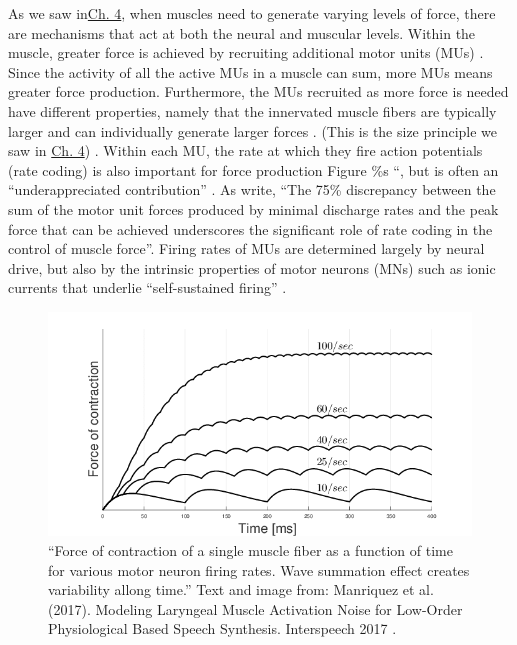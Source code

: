 \documentclass{article}
\begin{document}
As we saw in\href{https://curvenote.com/oxa:EPpXta8zJdzN048lz8AR/oZzZ9YkLDYhuIWC3d5Sk}{Ch. 4}, when muscles need to generate varying levels of force, there are mechanisms that act at both the neural and muscular levels. Within the muscle, greater force is achieved by recruiting additional motor units (MUs) \citep{openStax_neuro}. Since the activity of all the active MUs in a muscle can sum, more MUs means greater force production. Furthermore, the MUs recruited as more force is needed have different properties, namely that the innervated muscle fibers are typically larger and can individually generate larger forces \citep{Mendell2005size}. (This is the size principle we saw in \href{https://curvenote.com/oxa:EPpXta8zJdzN048lz8AR/oZzZ9YkLDYhuIWC3d5Sk}{Ch. 4}) . Within each MU, the rate at which they fire action potentials (rate coding) is also important for force production \citep{}Figure \%s ``, but is often an ``underappreciated contribution'' \citep{enoka2017rate}. As \citet{enoka2017rate} write, ``The 75\% discrepancy between the sum of the motor unit forces produced by minimal discharge rates and the peak force that can be achieved underscores the significant role of rate coding in the control of muscle force''. Firing rates of MUs are determined largely by neural drive, but also by the intrinsic properties of motor neurons (MNs) such as ionic currents that underlie ``self-sustained firing'' \citep{heckman2004physiology}.

\begin{figure}[!htbp]
\centering
\includegraphics[width=0.8\linewidth]{files/EPpXta8zJdzN048lz8AR-b1e9fbe07b082d58952602b11cad6575.png}
\caption[]{``Force of contraction of a single muscle fiber as a function of time for various motor neuron firing rates. Wave summation effect creates variability allong time.'' Text and image from: Manriquez et al. (2017). Modeling Laryngeal Muscle Activation Noise for Low-Order Physiological Based Speech Synthesis. Interspeech 2017 \cite{Manr_quez_2017}.}
\label{WeuzouGn9A}
\end{figure}
\end{document}
